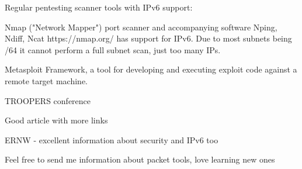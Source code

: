 \documentclass[18pt,landscape,a4paper,footrule]{foils}
\begin{document}

Regular pentesting scanner tools with IPv6 support:

\begin{list2}
\item Nmap ("Network Mapper") port scanner and accompanying software Nping, Ndiff, Ncat https://nmap.org/ has support for IPv6. Due to most subnets being /64 it cannot perform a full subnet scan, just too many IPs.
\item Metasploit Framework, a tool for developing and executing exploit code against a remote target machine.
\end{list2}

\myquestionspage



\begin{list2}
\item TROOPERS conference 
\item Good article with more links\\ 
\item ERNW - excellent information about security and IPv6 too 
\end{list2}



Feel free to send me information about packet tools, love learning new ones \smiley
\end{document}
